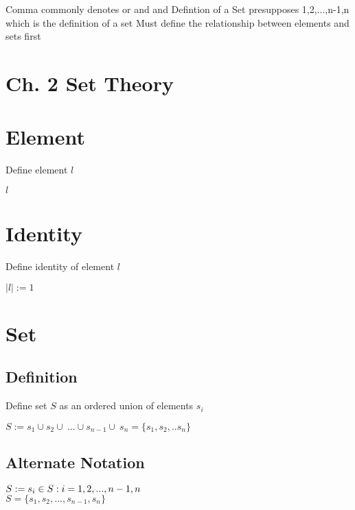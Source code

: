 \documentclass[11pt]{article}
\begin{document}
Comma commonly denotes or and and
Defintion of a Set presupposes 1,2,...,n-1,n which is the definition of a set
Must define the relationship between elements and sets first

\section*{Ch. 2 Set Theory}





\section{Element}
Define element $l$
\begin{center}
$
l
$
\end{center}







\section{Identity}
Define identity of element $l$\\

\begin{center}
$
|l| := 1
$
\end{center}



\section{Set}
\subsection{Definition}
Define set $S$ as an ordered union of elements $s_i$

\begin{center}
$
S :=   s_1 \cup  s_2 \cup\ ... \cup s_{n-1} \cup\ s_n = \{s_1,s_2,..s_n\}
$
\end{center}
\subsection{Alternate Notation}
\begin{center}
$
S := s_i \in  S :  i=1,2,...,n-1,n \hspace{5mm}$
\\$
S = \{s_1,s_2,...,s_{n-1},s_n\}
$

\end{center}
\end{document}
